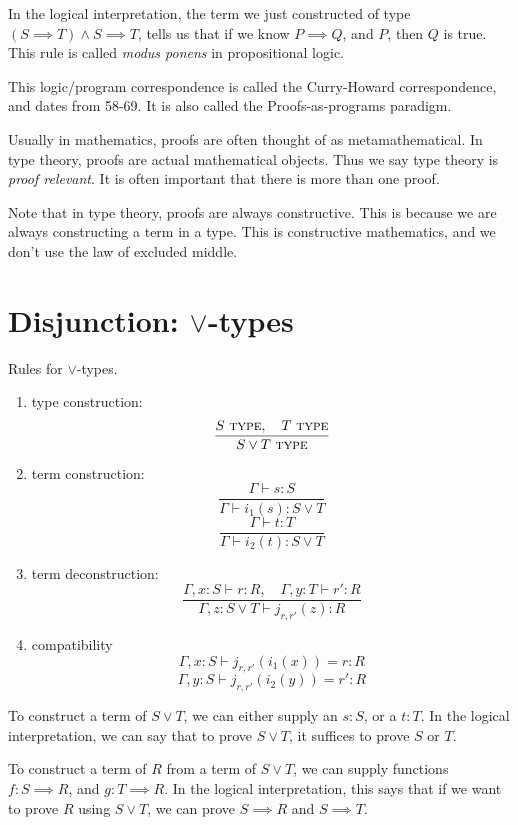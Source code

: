 \documentclass{article}
\newcommand{\yields}{\vdash}
\newcommand\TYPE{\text{ \scshape{type}}}
\theoremstyle{remark}
\begin{document}
In the logical interpretation, the term we just constructed of
type $(S\implies T)\wedge S \implies T$, tells us that 
if we know $P\implies Q$, and $P$, then $Q$ is true. This 
rule is called \emph{modus ponens} in propositional logic.

This logic/program correspondence is called the Curry-Howard
correspondence, and dates from 58-69. It is also called 
the Proofs-as-programs paradigm.

Usually in mathematics, proofs are often thought of as
metamathematical. In type theory, proofs are actual mathematical 
objects. Thus we say type theory is \emph{proof relevant}.
It is often important that there is more than one proof.

Note that in type theory, proofs are always constructive.
This is because we are always constructing a term in a type.
This is constructive mathematics, and we don't use the law of 
excluded middle.

\section{Disjunction: $\vee$-types}

\begin{definition}
    Rules for $\vee$-types.

    \begin{enumerate}
        \item type construction:
            \[ \frac{S\TYPE,\quad T\TYPE}{S\vee T\TYPE}\]
        \item term construction:
            \[\frac{\Gamma\yields s:S}{\Gamma\yields i_1(s):S\vee T}\]
            \[\frac{\Gamma\yields t:T}{\Gamma\yields i_2(t):S\vee T}\]
        \item term deconstruction:
            \[ \frac{\Gamma,x:S\yields r:R,\quad 
            \Gamma, y:T\yields r':R}{
                \Gamma, z:S\vee T \yields j_{r,r'}(z) :R
            }
            \]
        \item compatibility
            \[ \Gamma,x:S\yields j_{r,r'}(i_1(x))=r:R \]
            \[ \Gamma,y:S\yields j_{r,r'}(i_2(y))=r':R \]
    \end{enumerate}
\end{definition}

To construct a term of $S\vee T$, we can either supply an $s:S$,
or a $t:T$. In the logical interpretation, we can 
say that to prove $S\vee T$, it suffices to prove $S$
or $T$.

To construct a term of $R$ from a term of $S\vee T$, 
we can supply functions $f:S\implies R$, and $g:T\implies R$.
In the logical interpretation, this says that if we want to 
prove $R$ using $S\vee T$, we can prove $S\implies R$ and 
$S\implies T$.
\end{document}
